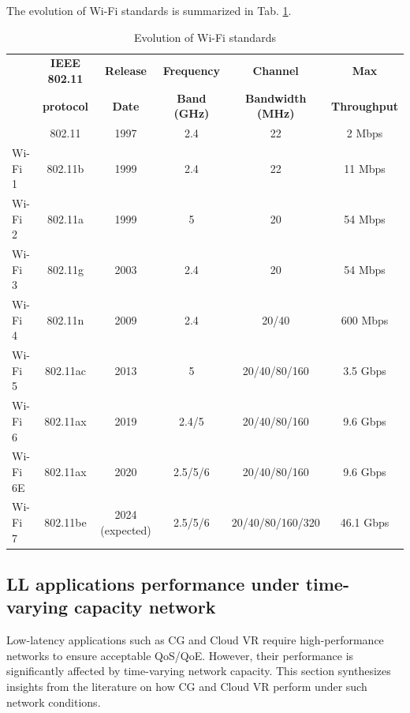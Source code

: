 The evolution of Wi-Fi standards is summarized in Tab. \ref{tab:wifi_standard}.

\begin{table}[!h]
\setlength\tabcolsep{1pt} 
    
\begin{tabular*}{\linewidth}{@{\extracolsep{\fill}} lccccc}
    \toprule
       & \bf IEEE 802.11 & \bf Release & \bf Frequency & \bf Channel & \bf Max \\
       & \bf protocol & \bf Date & \bf Band (GHz) & \bf Bandwidth (MHz) & \bf Throughput \\
    \addlinespace
    \cmidrule{1-6}
            & 802.11 & 1997 & 2.4 & 22 & 2 Mbps \\
    Wi-Fi 1 & 802.11b & 1999 & 2.4 & 22 & 11 Mbps \\
    Wi-Fi 2 & 802.11a & 1999 & 5 & 20 & 54 Mbps \\
    Wi-Fi 3 & 802.11g & 2003 & 2.4 & 20 & 54 Mbps \\
    Wi-Fi 4 & 802.11n & 2009 & 2.4 & 20/40 & 600 Mbps \\
    Wi-Fi 5 & 802.11ac & 2013 & 5 & 20/40/80/160 & 3.5 Gbps \\
    Wi-Fi 6 & 802.11ax & 2019 & 2.4/5 & 20/40/80/160 & 9.6 Gbps\\
    Wi-Fi 6E & 802.11ax & 2020 & 2.5/5/6 & 20/40/80/160 & 9.6 Gbps \\
    Wi-Fi 7 & 802.11be & 2024 (expected) & 2.5/5/6 & 20/40/80/160/320 & 46.1 Gbps \\
    \bottomrule

\end{tabular*}
\caption{Evolution of Wi-Fi standards}
\label{tab:wifi_standard}
\end{table}


\subsection{LL applications performance under time-varying capacity network}
Low-latency applications such as CG and Cloud VR require high-performance networks to ensure acceptable \ac{QoS}/\ac{QoE}. However, their performance is significantly affected by time-varying network capacity. This section synthesizes insights from the literature on how CG and Cloud VR perform under such network conditions.

